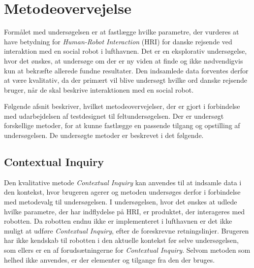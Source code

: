 \section{Metodeovervejelse}
\label{ParametreMetodeovervejelser}
%
Formålet med undersøgelsen er at fastlægge hvilke parametre, der vurderes at have betydning for \textit{Human-Robot Interaction} (HRI) for danske rejsende ved interaktion med en social robot i lufthavnen. Det er en eksplorativ undersøgelse, hvor det ønskes, at undersøge om der er ny viden at finde og ikke nødvendigvis kun at bekræfte allerede fundne resultater. Den indsamlede data forventes derfor at være kvalitativ, da der primært vil blive undersøgt hvilke ord danske rejsende bruger, når de skal beskrive interaktionen med en social robot. 

Følgende afsnit beskriver, hvilket metodeovervejelser, der er gjort i forbindelse med udarbejdelsen af testdesignet til feltundersøgelsen. Der er undersøgt forskellige metoder, for at kunne fastlægge en passende tilgang og opstilling af undersøgelsen. De undersøgte metoder er beskrevet i det følgende. 

\subsection{Contextual Inquiry}
\label{ParametreContextualInquiry}
%
Den kvalitative metode \textit{Contextual Inquiry} kan anvendes til at indsamle data i den kontekst, hvor brugeren agerer og metoden undersøges derfor i forbindelse med metodevalg til undersøgelsen. 
%
%
I undersøgelsen, hvor det ønskes at udlede hvilke parametre, der har indflydelse på HRI, er produktet, der interageres med robotten. Da robotten endnu ikke er implementeret i lufthavnen er det ikke muligt at udføre \textit{Contextual Inquiry}, efter de foreskrevne retningslinjer. Brugeren har ikke kendskab til robotten i den aktuelle kontekst før selve undersøgelsen, som ellers er en af forudsætningerne for \textit{Contextual Inquiry}. Selvom metoden som helhed ikke anvendes, er der elementer og tilgange fra den der bruges.

